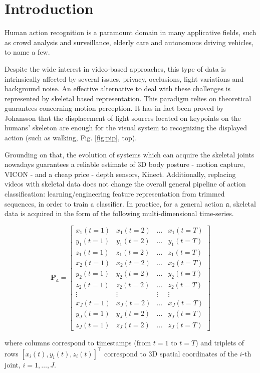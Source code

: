 \documentclass[10pt,twocolumn]{article}
\begin{document}
\section{Introduction}

Human action recognition is a paramount domain in many applicative fields, such as crowd analysis and surveillance, elderly care and autonomous driving vehicles, to name a few. 

Despite the wide interest in video-based approaches, this type of data is intrinsically affected by several issues, \eg privacy, occlusions, light variations and background noise. An effective alternative to deal with these challenges is represented by skeletal based representation. This paradigm relies on theoretical guarantees concerning motion perception. It has in fact been proved by Johansson \cite{Johansson} that the displacement of light sources located on keypoints on the humans' skeleton are enough for the visual system to recognizing the displayed action (such as walking, Fig. \ref{fig:pip}, top).



Grounding on that, the evolution of systems which can acquire the skeletal joints nowadays guarantees a reliable estimate of 3D body posture - motion capture, \eg VICON - and a cheap price - depth sensors, \eg Kinect. Additionally, replacing videos with skeletal data does not change the overall general pipeline of action classification: learning/engineering feature representation from trimmed sequences, in order to train a classifier. In practice, for a general action $\mathfrak{a}$, skeletal data is acquired in the form of the following multi-dimensional time-series.
\begin{small}
\begin{equation}\label{eq:timeseries}
\mathbf{P}_\mathfrak{a} = \begin{bmatrix}
x_1(t = 1) & x_1(t = 2) & \dots & x_1(t = T) \\
y_1(t = 1) & y_1(t = 2) & \dots & y_1(t = T) \\
z_1(t = 1) & z_1(t = 2) & \dots & z_1(t = T) \\
x_2(t = 1) & x_2(t = 2) & \dots & x_2(t = T) \\
y_2(t = 1) & y_2(t = 2) & \dots & y_2(t = T) \\
z_2(t = 1) & z_2(t = 2) & \dots & z_2(t = T) \\
\vdots & \vdots & \vdots & \vdots \\
x_J(t = 1) & x_J(t = 2) & \dots & x_J(t = T) \\
y_J(t = 1) & y_J(t = 2) & \dots & y_J(t = T) \\
z_J(t = 1) & z_J(t = 2) & \dots & z_J(t = T) 
\end{bmatrix}
\end{equation} 
\end{small}
where columns correspond to timestamps (from $t=1$ to $t=T$) and triplets of rows $[x_i(t),y_i(t),z_i(t)]^\top$ correspond to 3D spatial coordinates of the $i$-th joint, $i = 1,\dots,J$.
\end{document}
